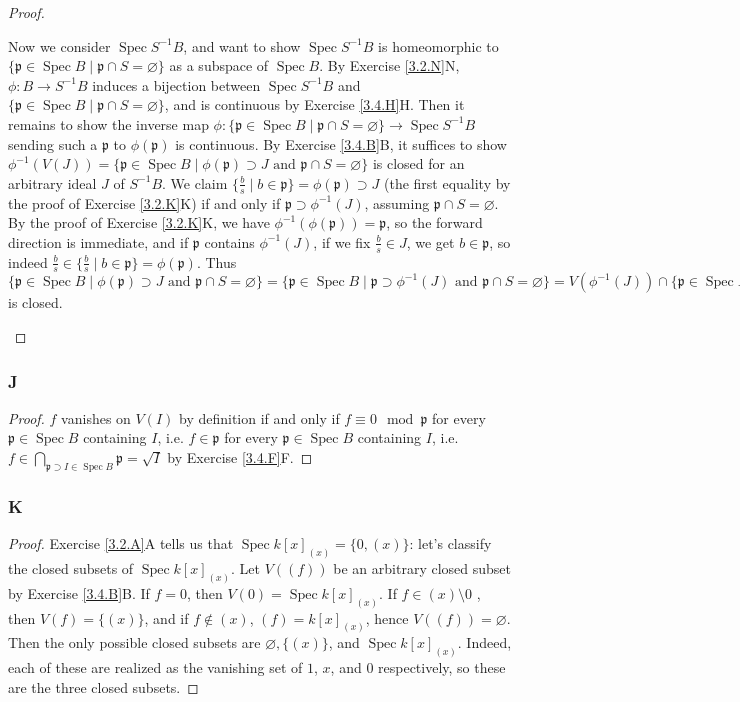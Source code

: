 \documentclass{article}
\newcommand{\frkp}{\mathfrak{p}}
\DeclareMathOperator{\Spec}{\mathrm{Spec}}
\let\emptyset\varnothing
\theoremstyle{definition} %
\begin{document}
\begin{proof}
\begin{enumerate}[(a)]
        Now we consider $\Spec S^{-1} B$, and want to show $\Spec S^{-1}B$ is homeomorphic to $\{\frkp \in \Spec B \mid \frkp \cap S = \emptyset\}$ as a subspace of $\Spec B$. By Exercise \ref{3.2.N}N, $\phi:B\to S^{-1}B$ induces a bijection between $\Spec S^{-1}B$ and $\{\frkp \in \Spec B \mid \frkp \cap S = \emptyset\}$, and is continuous by Exercise \ref{3.4.H}H. Then it remains to show the inverse map $\phi:\{\frkp \in \Spec B \mid \frkp \cap S = \emptyset\} \to \Spec S^{-1}B$ sending such a $\frkp$ to $\phi(\frkp)$ is continuous. By Exercise \ref{3.4.B}B, it suffices to show $\phi^{-1}(V(J))=\{ \frkp \in \Spec B \mid \phi(\frkp) \supset J \text{ and } \frkp \cap S = \emptyset\}$ is closed for an arbitrary ideal $J$ of $S^{-1}B$. We claim $\{ \frac{b}{s} \mid b \in \frkp \} = \phi(\frkp)\supset J$ (the first equality by the proof of Exercise \ref{3.2.K}K) if and only if $\frkp \supset \phi^{-1}(J)$, assuming $\frkp \cap S = \emptyset$. By the proof of Exercise \ref{3.2.K}K, we have $\phi^{-1}(\phi(\frkp))=\frkp$, so the forward direction is immediate, and if $\frkp$ contains $\phi^{-1}(J)$, if we fix $\frac{b}{s}\in J$, we get $b\in \frkp$, so indeed $\frac{b}{s}\in \{ \frac{b}{s} \mid b \in \frkp \} = \phi(\frkp)$. Thus $\{ \frkp \in \Spec B \mid \phi(\frkp) \supset J \text{ and } \frkp \cap S = \emptyset\}=\{\frkp \in \Spec B \mid \frkp \supset \phi^{-1}(J) \text{ and } \frkp \cap S = \emptyset\} =V(\phi^{-1}(J)) \cap \{\frkp \in \Spec B \mid  \frkp \cap S = \emptyset\}$ is closed.
    \end{enumerate}
\end{proof}
\subsubsection{J}\label{3.4.J}
\begin{proof}
    $f$ vanishes on $V(I)$ by definition if and only if $f\equiv 0 \mod \frkp$ for every $\frkp \in \Spec B$ containing $I$, i.e. $f\in \frkp $ for every $\frkp \in \Spec B$ containing $I$, i.e. $f\in \bigcap_{\frkp \supset I \in \Spec B} \frkp = \sqrt I$ by Exercise \ref{3.4.F}F.
\end{proof}
\subsubsection{K}\label{3.4.K}
\begin{proof}
    Exercise \ref{3.2.A}A tells us that $\Spec k[x]_{(x)} = \{ 0, (x)\}$: let's classify the closed subsets of $\Spec k[x]_{(x)}$. Let $V((f))$ be an arbitrary closed subset by Exercise \ref{3.4.B}B. If $f=0$, then $V(0)=\Spec k[x]_{(x)}$. If $f\in (x)\setminus 0$ , then $V(f)=\{(x)\}$, and if $f\notin (x)$, $(f)= k[x]_{(x)}$, hence $V((f))=\emptyset$. Then the only possible closed subsets are $\emptyset, \{(x)\}$, and $\Spec k[x]_{(x)}.$ Indeed, each of these are realized as the vanishing set of $1$, $x$, and $0$ respectively, so these are the three closed subsets.
\end{proof}
\end{document}
